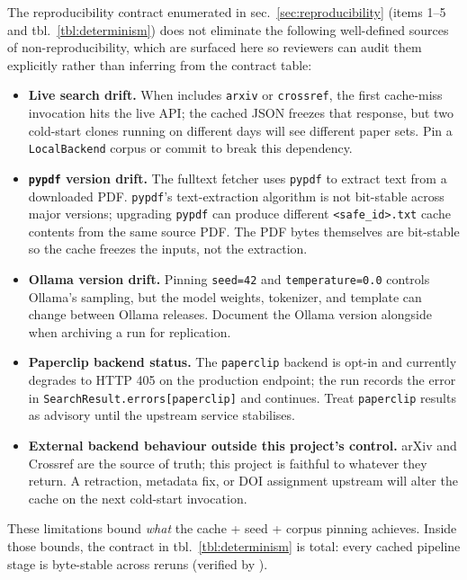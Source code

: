 \documentclass[
]{article}
\providecommand{\tightlist}{%
  \setlength{\itemsep}{0pt}\setlength{\parskip}{0pt}}
\begin{document}
The reproducibility contract enumerated in
sec.~\ref{sec:reproducibility} (items 1--5 and
tbl.~\ref{tbl:determinism}) does not eliminate the following
well-defined sources of non-reproducibility, which are surfaced here so
reviewers can audit them explicitly rather than inferring from the
contract table:

\begin{itemize}
\tightlist
\item
  \textbf{Live search drift.} When 
  includes \texttt{arxiv} or \texttt{crossref}, the first cache-miss
  invocation hits the live API; the cached JSON freezes that response,
  but two cold-start clones running on different days will see different
  paper sets. Pin a \texttt{LocalBackend} corpus or commit
   to break this dependency.
\item
  \textbf{\texttt{pypdf} version drift.} The fulltext fetcher uses
  \texttt{pypdf} to extract text from a downloaded PDF. \texttt{pypdf}'s
  text-extraction algorithm is not bit-stable across major versions;
  upgrading \texttt{pypdf} can produce different
  \texttt{\textless{}safe\_id\textgreater{}.txt} cache contents from the
  same source PDF. The PDF bytes themselves are bit-stable so the cache
  freezes the inputs, not the extraction.
\item
  \textbf{Ollama version drift.} Pinning \texttt{seed=42} and
  \texttt{temperature=0.0} controls Ollama's sampling, but the model
  weights, tokenizer, and template can change between Ollama releases.
  Document the Ollama version alongside  when
  archiving a run for replication.
\item
  \textbf{Paperclip backend status.} The \texttt{paperclip} backend is
  opt-in and currently degrades to HTTP 405 on the production endpoint;
  the run records the error in
  \texttt{SearchResult.errors{[}paperclip{]}} and continues. Treat
  \texttt{paperclip} results as advisory until the upstream service
  stabilises.
\item
  \textbf{External backend behaviour outside this project's control.}
  arXiv and Crossref are the source of truth; this project is faithful
  to whatever they return. A retraction, metadata fix, or DOI assignment
  upstream will alter the cache on the next cold-start invocation.
\end{itemize}

These limitations bound \emph{what} the cache + seed + corpus pinning
achieves. Inside those bounds, the contract in
tbl.~\ref{tbl:determinism} is total: every cached pipeline stage is
byte-stable across reruns (verified by
).
\end{document}
